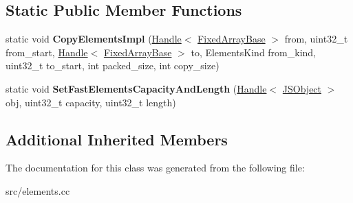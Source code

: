 \subsection*{Static Public Member Functions}
\begin{DoxyCompactItemize}
\item 
\hypertarget{classv8_1_1internal_1_1_fast_smi_or_object_elements_accessor_ac52a998140ecde6215c3544cc7ebdd46}{}static void {\bfseries Copy\+Elements\+Impl} (\hyperlink{classv8_1_1internal_1_1_handle}{Handle}$<$ \hyperlink{classv8_1_1internal_1_1_fixed_array_base}{Fixed\+Array\+Base} $>$ from, uint32\+\_\+t from\+\_\+start, \hyperlink{classv8_1_1internal_1_1_handle}{Handle}$<$ \hyperlink{classv8_1_1internal_1_1_fixed_array_base}{Fixed\+Array\+Base} $>$ to, Elements\+Kind from\+\_\+kind, uint32\+\_\+t to\+\_\+start, int packed\+\_\+size, int copy\+\_\+size)\label{classv8_1_1internal_1_1_fast_smi_or_object_elements_accessor_ac52a998140ecde6215c3544cc7ebdd46}

\item 
\hypertarget{classv8_1_1internal_1_1_fast_smi_or_object_elements_accessor_a68839b6b2e1542ae19c842eb6b648ad6}{}static void {\bfseries Set\+Fast\+Elements\+Capacity\+And\+Length} (\hyperlink{classv8_1_1internal_1_1_handle}{Handle}$<$ \hyperlink{classv8_1_1internal_1_1_j_s_object}{J\+S\+Object} $>$ obj, uint32\+\_\+t capacity, uint32\+\_\+t length)\label{classv8_1_1internal_1_1_fast_smi_or_object_elements_accessor_a68839b6b2e1542ae19c842eb6b648ad6}

\end{DoxyCompactItemize}
\subsection*{Additional Inherited Members}


The documentation for this class was generated from the following file\+:\begin{DoxyCompactItemize}
\item 
src/elements.\+cc\end{DoxyCompactItemize}
